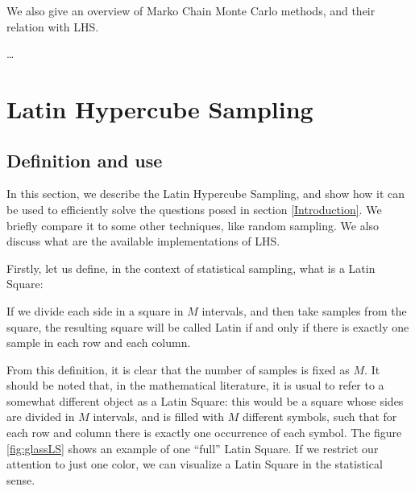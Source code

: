 \documentclass[12pt,a4paper]{article}
\newenvironment{definition}[1][Definition]{\begin{trivlist}
	\item[\hskip \labelsep {\bfseries #1}]}{\end{trivlist}}
\begin{document}
We also give an overview of Marko Chain Monte Carlo methods, and their relation with LHS.

\dots

\section{Latin Hypercube Sampling}
\subsection{Definition and use}
In this section, we describe the Latin Hypercube Sampling, and show how it can be used to efficiently solve the questions
posed in section \ref{Introduction}. We briefly compare it to some other techniques, like random sampling. We also discuss
what are the available implementations of LHS. 

Firstly, let us define, in the context of statistical sampling, what is a Latin Square:
\begin{definition}
If we divide each side in a square in $M$ intervals, and then take samples from the square, the resulting square will be called
Latin if and only if there is exactly one sample in each row and each column.
\end{definition}

From this definition, it is clear that the number of samples is fixed as $M$. It should be noted that, in the mathematical
literature, it is usual to refer to a somewhat different object as a Latin Square: this would be a square whose sides are 
divided in $M$ intervals, and is filled with $M$ different symbols, such that for each row and column there is exactly one 
occurrence of each symbol. The figure \ref{fig:glassLS} shows an example of one ``full'' Latin Square. If we restrict our
attention to just one color, we can visualize a Latin Square in the statistical sense.
\end{document}
